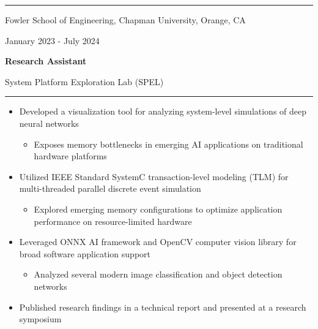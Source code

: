 \documentclass[letter]{article}
\begin{document}
    \medskip
    \vspace{4pt}
    \hrule height 1pt
    \vspace{4pt}
    \noindent
    \begin{minipage}[c]{0.65\linewidth}
        \noindent Fowler School of Engineering, Chapman University, Orange, CA
    \end{minipage}
    \begin{minipage}[c]{0.341\linewidth}
        \begin{flushright}
            January 2023 - July 2024
        \end{flushright}
    \end{minipage}
    \begin{minipage}[c]{0.65\linewidth}
        \noindent \textbf{Research Assistant}
    \end{minipage}
    \begin{minipage}[c]{0.341\linewidth}
        \begin{flushright}
            \noindent System Platform Exploration Lab (SPEL)
        \end{flushright}
    \end{minipage}
    \noindent
    \vspace{4pt}
    \hrule
    \vspace{4pt}
    \noindent
    \begin{itemize}[noitemsep, topsep=0pt]
        \item Developed a visualization tool for analyzing system-level simulations of deep neural networks
            \begin{itemize}[noitemsep, topsep=0pt]
            \item Exposes memory bottlenecks in emerging AI applications on traditional hardware platforms
            \end{itemize}
        \item Utilized IEEE Standard SystemC transaction-level modeling (TLM) for multi-threaded parallel discrete event simulation
            \begin{itemize}[noitemsep, topsep=0pt]
            \item Explored emerging memory configurations to optimize application performance on resource-limited hardware
            \end{itemize}
        \item Leveraged ONNX AI framework and OpenCV computer vision library for broad software application support
            \begin{itemize}[noitemsep, topsep=0pt]
            \item Analyzed several modern image classification and object detection networks
            \end{itemize}
        \item Published research findings in a technical report and presented at a research symposium
    \end{itemize}
    \medskip
\end{document}
